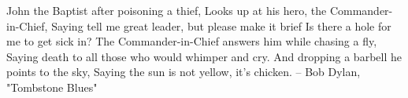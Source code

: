 \setcounter{equation}{0}  

John the Baptist after poisoning a thief,
Looks up at his hero, the Commander-in-Chief,
Saying tell me great leader, but please make it brief
Is there a hole for me to get sick in?
 The Commander-in-Chief answers him while chasing a fly,
Saying death to all those who would whimper and cry.
And dropping a barbell he points to the sky,
Saying the sun is not yellow, it's chicken.
		-- Bob Dylan, "Tombstone Blues"